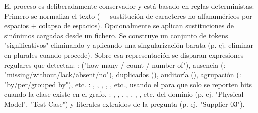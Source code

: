 {}El proceso es deliberadamente conservador y está basado en reglas deterministas:\markdownRendererInterblockSeparator
{}\markdownRendererUlBeginTight
\markdownRendererUlItem Primero se normaliza el texto ( + sustitución de caracteres no alfanuméricos por espacios + colapso de espacios). Opcionalmente se aplican sustituciones de sinónimos cargadas desde un fichero.\markdownRendererUlItemEnd 
\markdownRendererUlItem Se construye un conjunto de tokens "significativos" eliminando  y aplicando una singularización barata (p. ej. eliminar  en plurales cuando procede).\markdownRendererUlItemEnd 
\markdownRendererUlItem Sobre esa representación se disparan expresiones regulares que detectan:\markdownRendererInterblockSeparator
{}\markdownRendererUlBeginTight
\markdownRendererUlItem {}:  ("how many / count / number of"), ausencia (: "missing/without/lack/absent/no"), duplicados (), auditoría (), agrupación (: "by/per/grouped by"), etc.\markdownRendererUlItemEnd 
\markdownRendererUlItem {}: , , , , , etc., usando el  para que solo se reporten hits cuando la clase existe en el grafo.\markdownRendererUlItemEnd 
\markdownRendererUlItem {}: , , , , , , , etc.\markdownRendererUlItemEnd 
\markdownRendererUlItem {} del dominio (p. ej. "Physical Model", "Test Case") y literales extraídos de la pregunta (p. ej. "Supplier 03").\markdownRendererUlItemEnd 
\markdownRendererUlEndTight \markdownRendererUlItemEnd 
\markdownRendererUlEndTight \markdownRendererInterblockSeparator
